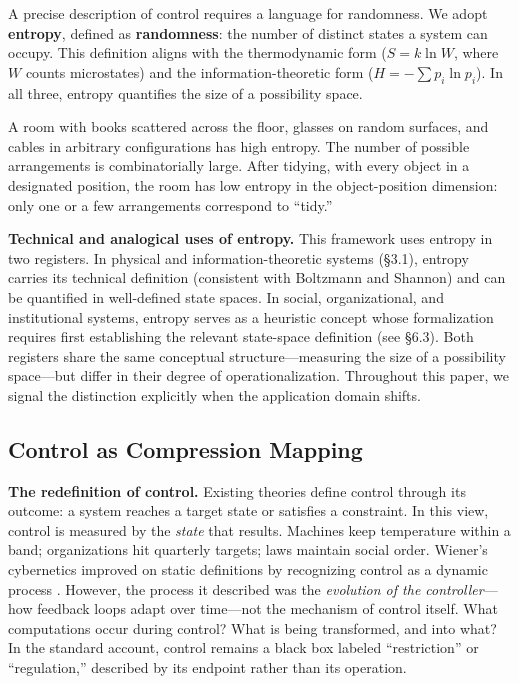 \documentclass[11pt,a4paper]{article}
\begin{document}
A precise description of control requires a language for randomness. We adopt \textbf{entropy}, defined as \textbf{randomness}: the number of distinct states a system can occupy. This definition aligns with the thermodynamic form ($S = k \ln W$, where $W$ counts microstates) and the information-theoretic form ($H = -\sum p_i \ln p_i$). In all three, entropy quantifies the size of a possibility space.

A room with books scattered across the floor, glasses on random surfaces, and cables in arbitrary configurations has high entropy. The number of possible arrangements is combinatorially large. After tidying, with every object in a designated position, the room has low entropy in the object-position dimension: only one or a few arrangements correspond to ``tidy.''

\textbf{Technical and analogical uses of entropy.} This framework uses entropy in two registers. In physical and information-theoretic systems (\S3.1), entropy carries its technical definition (consistent with Boltzmann and Shannon) and can be quantified in well-defined state spaces. In social, organizational, and institutional systems, entropy serves as a heuristic concept whose formalization requires first establishing the relevant state-space definition (see \S6.3). Both registers share the same conceptual structure---measuring the size of a possibility space---but differ in their degree of operationalization. Throughout this paper, we signal the distinction explicitly when the application domain shifts.

\subsection{Control as Compression Mapping}

\textbf{The redefinition of control.} Existing theories define control through its outcome: a system reaches a target state or satisfies a constraint. In this view, control is measured by the \textit{state} that results. Machines keep temperature within a band; organizations hit quarterly targets; laws maintain social order. Wiener's cybernetics improved on static definitions by recognizing control as a dynamic process \citep{wiener1948}. However, the process it described was the \textit{evolution of the controller}---how feedback loops adapt over time---not the mechanism of control itself. What computations occur during control? What is being transformed, and into what? In the standard account, control remains a black box labeled ``restriction'' or ``regulation,'' described by its endpoint rather than its operation.
\end{document}
